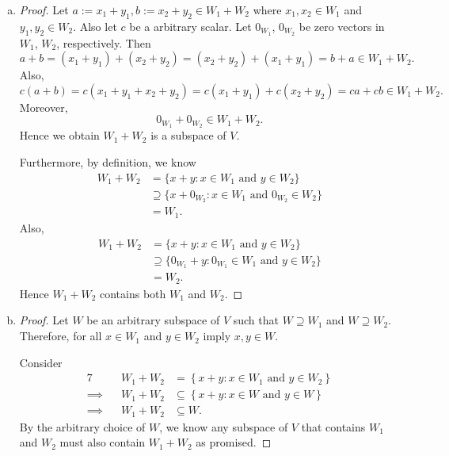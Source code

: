 \begin{Exercise}
\begin{enumerate}[(a)]
\item
\begin{proof}
Let $a := x_1+y_1, b := x_2+y_2\in W_1+W_2$ where $x_1,x_2\in W_1$ and $y_1,y_2\in W_2$. Also let $c$ be a arbitrary scalar. Let $0_{W_1}$, $0_{W_2}$ be zero vectors in $W_1$, $W_2$, respectively. Then
$$
a+b
= (x_1+y_1) + (x_2+y_2)
= (x_2+y_2) + (x_1+y_1)
= b+a \in W_1+W_2.
$$
Also,
$$
c (a+b)
= c (x_1+y_1+x_2+y_2)
= c (x_1+y_1) + c(x_2+y_2)
= c a + c b \in W_1+W_2.
$$
Moreover,
$$
0_{W_1} + 0_{W_2} \in W_1+W_2.
$$
Hence we obtain $W_1+W_2$ is a subspace of $V$.

Furthermore, by definition, we know
\begin{align*}
W_1+W_2
&= \{x+y:x\in W_1\text{ and }y\in W_2\} \\
&\supseteq \{x+0_{W_2}:x\in W_1\text{ and } 0_{W_2}\in W_2\} \\
&= W_1.
\end{align*}
Also,
\begin{align*}
W_1+W_2
&= \{x+y:x\in W_1\text{ and }y\in W_2\} \\
&\supseteq \{0_{W_1}+y:0_{W_1}\in W_1\text{ and } y\in W_2\} \\
&= W_2.
\end{align*}
Hence $W_1+W_2$ contains both $W_1$ and $W_2$.
\end{proof}

\item 
\begin{proof}
Let $W$ be an arbitrary subspace of $V$ such that $W\supseteq W_1$ and $W\supseteq W_2$. Therefore, for all $x\in W_1$ and $y\in W_2$ imply $x,y\in W$.

Consider
\begin{alignat*}{7}
\quad&& W_1+W_2 &= \left\{x+y:x\in W_1\text{ and }y\in W_2\right\} \\
\implies&& W_1+W_2 &\subseteq \left\{x+y:x\in W\text{ and }y\in W\right\} \\
\implies&& W_1+W_2 &\subseteq W.
\end{alignat*}
By the arbitrary choice of $W$, we know any subspace of $V$ that contains $W_1$ and $W_2$ must also contain $W_1+W_2$ as promised.
\end{proof}
\end{enumerate}
\end{Exercise}